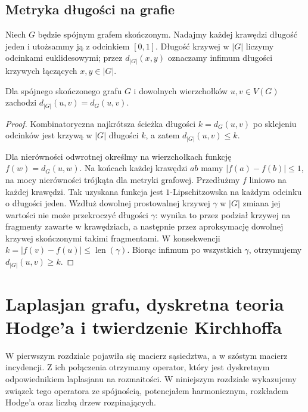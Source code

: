 \section{Metryka długości na grafie}
\label{sec:tg-metric}

\begin{definicja}
Niech $G$ będzie spójnym grafem skończonym. Nadajmy każdej
krawędzi długość jeden i utożsammy ją z odcinkiem $[0,1]$.
Długość krzywej w $|G|$ liczymy odcinkami euklidesowymi;
przez $d_{|G|}(x,y)$ oznaczamy infimum długości krzywych
łączących $x,y\in|G|$.
\end{definicja}

\begin{stwierdzenie}
Dla spójnego skończonego grafu $G$ i dowolnych wierzchołków
$u,v\in V(G)$ zachodzi $d_{|G|}(u,v)=d_G(u,v)$.
\end{stwierdzenie}

\begin{proof}
Kombinatoryczna najkrótsza ścieżka długości $k=d_G(u,v)$
po sklejeniu odcinków jest krzywą w $|G|$ długości $k$,
a zatem $d_{|G|}(u,v)\le k$.

Dla nierówności odwrotnej określmy na wierzchołkach funkcję
$f(w)=d_G(u,w)$. Na końcach każdej krawędzi $ab$ mamy
$|f(a)-f(b)|\le1$, na mocy nierówności trójkąta dla
metryki grafowej. Przedłużmy $f$ liniowo na każdej krawędzi.
Tak uzyskana funkcja jest $1$-Lipschitzowska na każdym
odcinku o długości jeden. Wzdłuż dowolnej prostowalnej
krzywej $\gamma$ w $|G|$ zmiana jej wartości nie może
przekroczyć długości $\gamma$: wynika to przez podział
krzywej na fragmenty zawarte w krawędziach, a następnie
przez aproksymację dowolnej krzywej skończonymi takimi
fragmentami. W konsekwencji
$k=|f(v)-f(u)|\le\operatorname{len}(\gamma)$.
Biorąc infimum po wszystkich $\gamma$, otrzymujemy
$d_{|G|}(u,v)\ge k$.
\end{proof}

\chapter{Laplasjan grafu, dyskretna teoria Hodge'a i twierdzenie Kirchhoffa}
\label{ch:tg-laplacian}

W pierwszym rozdziale pojawiła się macierz sąsiedztwa, a w szóstym
macierz incydencji. Z ich połączenia otrzymamy operator, który
jest dyskretnym odpowiednikiem laplasjanu na rozmaitości.
W niniejszym rozdziale wykazujemy związek tego operatora
ze spójnością, potencjałem harmonicznym, rozkładem Hodge'a
oraz liczbą drzew rozpinających.

